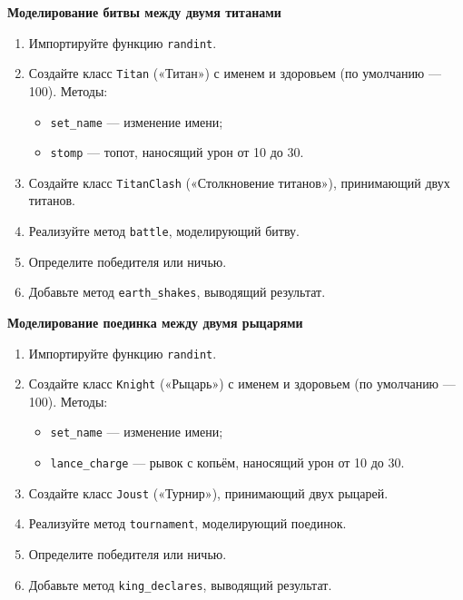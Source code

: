 \item \textbf{Моделирование битвы между двумя титанами}

\begin{enumerate}
    \item Импортируйте функцию \texttt{randint}.

    \item Создайте класс \texttt{Titan} («Титан») с именем и здоровьем (по умолчанию — 100).  
    Методы:
    \begin{itemize}
        \item \texttt{set\_name} — изменение имени;
        \item \texttt{stomp} — топот, наносящий урон от 10 до 30.
    \end{itemize}

    \item Создайте класс \texttt{TitanClash} («Столкновение титанов»), принимающий двух титанов.

    \item Реализуйте метод \texttt{battle}, моделирующий битву.

    \item Определите победителя или ничью.

    \item Добавьте метод \texttt{earth\_shakes}, выводящий результат.
\end{enumerate}

\item \textbf{Моделирование поединка между двумя рыцарями}

\begin{enumerate}
    \item Импортируйте функцию \texttt{randint}.

    \item Создайте класс \texttt{Knight} («Рыцарь») с именем и здоровьем (по умолчанию — 100).  
    Методы:
    \begin{itemize}
        \item \texttt{set\_name} — изменение имени;
        \item \texttt{lance\_charge} — рывок с копьём, наносящий урон от 10 до 30.
    \end{itemize}

    \item Создайте класс \texttt{Joust} («Турнир»), принимающий двух рыцарей.

    \item Реализуйте метод \texttt{tournament}, моделирующий поединок.

    \item Определите победителя или ничью.

    \item Добавьте метод \texttt{king\_declares}, выводящий результат.
\end{enumerate}

